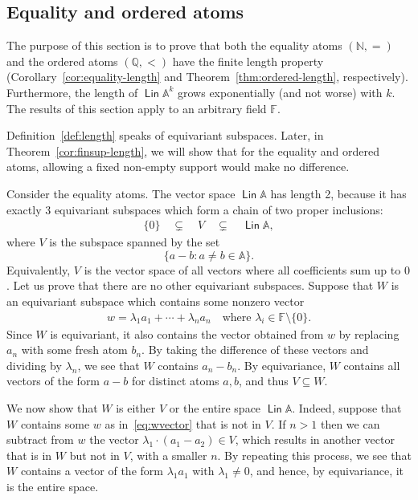 \documentclass[10pt,a4paper]{amsart}
\numberwithin{equation}{section}
\newcommand{\Nat}{{\mathbb N}}
\newcommand{\Rat}{{\mathbb Q}}
\newcommand{\set}[1]{\{#1\}}
\newcommand{\atoms}{\mathbb A}
\DeclareMathOperator{\lin}{\mathsf{Lin}}
\newcommand{\field}{\mathbb F}
\begin{document}
\subsection{Equality and ordered atoms}

The purpose of this section is to prove that both the equality atoms $(\Nat,=)$ and the ordered atoms $(\Rat, <)$ have the finite length property (Corollary~\ref{cor:equality-length} and Theorem~\ref{thm:ordered-length}, respectively). 
 Furthermore, the length of $\lin \atoms^k$ grows exponentially (and not worse) with $k$. The results of this section apply to an arbitrary field $\field$. 

 Definition~\ref{def:length} speaks of equivariant subspaces. Later, in Theorem~\ref{cor:finsup-length}, we will show that  for the equality and ordered atoms,   allowing a fixed non-empty support would make no difference.

\begin{example}\label{ex:moerman-space}
	Consider the equality atoms. The vector space $\lin \atoms$ has length 2, because it has exactly 3 equivariant subspaces which form a chain of two proper inclusions:
	\begin{align*}
	\set{0} \quad \subsetneq \quad V \quad \subsetneq \quad \lin \atoms,
	\end{align*}
	where $V$ is the subspace spanned by the set
	\[\set{a-b : a \neq b \in \atoms}.\]
	Equivalently, $V$ is the vector space of all vectors where all coefficients sum up to $0$.
	Let us prove that there are no other equivariant subspaces. Suppose that $W$ is an equivariant subspace which contains some nonzero vector 
	\begin{align}\label{eq:wvector}
	w = \lambda_1 a_1 + \cdots + \lambda_n a_n \quad \text{where $\lambda_i \in \field\setminus\set{0}$.}
	\end{align}
	Since $W$ is equivariant, it also contains the vector obtained from $w$ by replacing $a_n$ with some fresh atom $b_n$. By taking the difference of these vectors and dividing by $\lambda_n$, we see that $W$ contains  $a_n - b_n$. By equivariance, $W$ contains all vectors of the form $a - b$ for distinct atoms $a,b$, and thus $V \subseteq W$.

We now show that $W$ is either $V$ or the entire space $\lin \atoms$. Indeed, suppose that $W$ contains some $w$ as in~\eqref{eq:wvector} that is not in $V$.
		If $n > 1$ then we can subtract from $w$ the  vector $\lambda_1 \cdot (a_1  - a_2)\in V$, which results in another vector that is in $W$ but not in $V$, with a smaller $n$. By repeating this process, we see that $W$ contains a vector of the form $\lambda_1 a_1$ with $\lambda_1 \neq 0$, and hence, by equivariance, it is the entire space.
\end{example}
\end{document}
